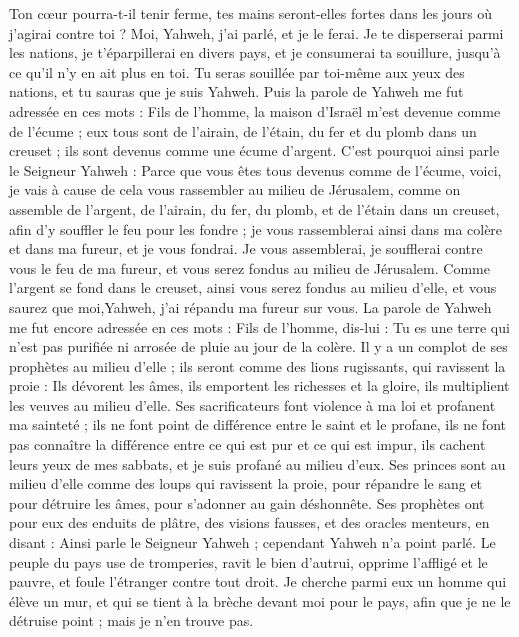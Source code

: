 \begin{multicols}{2}
Ton cœur pourra-t-il tenir ferme, tes mains seront-elles fortes dans les jours où j'agirai contre toi ? Moi, Yahweh, j'ai parlé, et je le ferai.
Je te disperserai parmi les nations, je t’éparpillerai en divers pays, et je consumerai ta souillure, jusqu'à ce qu'il n'y en ait plus en toi.
Tu seras souillée par toi-même aux yeux des nations, et tu sauras que je suis Yahweh.
Puis la parole de Yahweh me fut adressée en ces mots :
Fils de l’homme, la maison d'Israël m'est devenue comme de l'écume ; eux tous sont de l'airain, de l'étain, du fer et du plomb dans un creuset ; ils sont devenus comme une écume d'argent.
C'est pourquoi ainsi parle le Seigneur Yahweh : Parce que vous êtes tous devenus comme de l'écume, voici, je vais à cause de cela vous rassembler au milieu de Jérusalem,
comme on assemble de l'argent, de l'airain, du fer, du plomb, et de l'étain dans un creuset, afin d'y souffler le feu pour les fondre ; je vous rassemblerai ainsi dans ma colère et dans ma fureur, et je vous fondrai.
Je vous assemblerai, je soufflerai contre vous le feu de ma fureur, et vous serez fondus au milieu de Jérusalem.
Comme l'argent se fond dans le creuset, ainsi vous serez fondus au milieu d'elle, et vous saurez que moi,Yahweh, j'ai répandu ma fureur sur vous.
La parole de Yahweh me fut encore adressée en ces mots :
Fils de l’homme, dis-lui : Tu es une terre qui n’est pas purifiée ni arrosée de pluie au jour de la colère.
Il y a un complot de ses prophètes au milieu d'elle ; ils seront comme des lions rugissants, qui ravissent la proie : Ils dévorent les âmes, ils emportent les richesses et la gloire, ils multiplient les veuves au milieu d'elle\FTNT{}.
Ses sacrificateurs font violence à ma loi et profanent ma sainteté ; ils ne font point de différence entre le saint et le profane, ils ne font pas connaître la différence entre ce qui est pur et ce qui est impur, ils cachent leurs yeux de mes sabbats, et je suis profané au milieu d'eux.
Ses princes sont au milieu d'elle comme des loups qui ravissent la proie, pour répandre le sang et pour détruire les âmes, pour s'adonner au gain déshonnête\FTNT{}.
Ses prophètes ont pour eux des enduits de plâtre, des visions fausses, et des oracles menteurs, en disant : Ainsi parle le Seigneur Yahweh ; cependant Yahweh n'a point parlé.
Le peuple du pays use de tromperies, ravit le bien d'autrui, opprime l'affligé et le pauvre, et foule l'étranger contre tout droit.
Je cherche parmi eux un homme\FTNT{} qui élève un mur, et qui se tient à la brèche devant moi pour le pays, afin que je ne le détruise point ; mais je n'en trouve pas.

\end{multicols}
